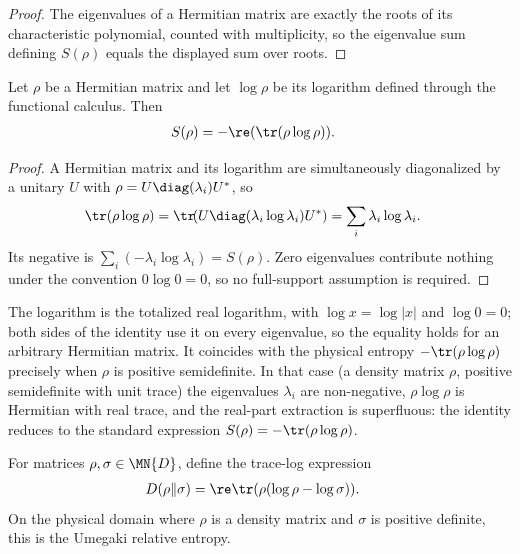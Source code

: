 \begin{proof}\leanok
    The eigenvalues of a Hermitian matrix are exactly the roots of its
    characteristic polynomial, counted with multiplicity, so the eigenvalue sum
    defining $S(\rho)$ equals the displayed sum over roots.
\end{proof}

\begin{theorem}
    \label{thm:entropy_eq_neg_trace_mul_log}
    \leanok
    Let $\rho$ be a Hermitian matrix and let $\log\rho$ be its logarithm defined
    through the functional calculus. Then
    \begin{align}
        S(\rho)
         & =-\re(\tr(\rho\log\rho)).
        \label{eq:entropy_trace_log}
    \end{align}
\end{theorem}

\begin{proof}\leanok
    A Hermitian matrix and its logarithm are simultaneously diagonalized by a
    unitary $U$ with $\rho=U\diag(\lambda_i)U^*$, so
    \begin{align}
        \tr(\rho\log\rho)
         & =\tr\!(U\diag(\lambda_i\log\lambda_i)U^*)
        =\sum_i\lambda_i\log\lambda_i.
        \notag
    \end{align}
    Its negative is $\sum_i({-}\lambda_i\log\lambda_i)=S(\rho)$. Zero
    eigenvalues contribute nothing under the convention $0\log 0=0$, so no
    full-support assumption is required.
\end{proof}

\begin{remark}
    The logarithm is the totalized real logarithm, with
    $\log x=\log\lvert x\rvert$ and $\log 0=0$; both sides of the identity
    use it on every eigenvalue, so the equality holds for an arbitrary Hermitian
    matrix. It coincides with the physical entropy $-\tr(\rho\log\rho)$
    precisely when $\rho$ is positive semidefinite. In that case (a density
    matrix $\rho$, positive semidefinite with unit trace) the eigenvalues
    $\lambda_i$ are non-negative, $\rho\log\rho$ is Hermitian with real trace,
    and the real-part extraction is superfluous: the identity reduces to the
    standard expression $S(\rho)=-\tr(\rho\log\rho)$.
\end{remark}

\begin{definition}\label{def:quantum_relative_entropy}
    \leanok
    For matrices $\rho,\sigma\in\MN{D}$, define the trace-log expression
    \begin{align}
        D(\rho\Vert\sigma)
         & =\re\tr(\rho(\log\rho-\log\sigma)).
        \label{eq:entropy_relative_definition}
    \end{align}
    On the physical domain where $\rho$ is a density matrix and $\sigma$ is
    positive definite, this is the Umegaki relative entropy.
\end{definition}

